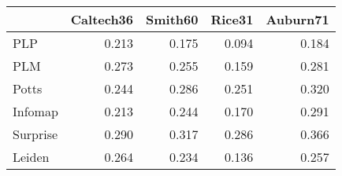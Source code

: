 \begin{tabular}{lrrrr}
\toprule
{} & Caltech36 & Smith60 & Rice31 & Auburn71 \\
\midrule
PLP      &     0.213 &   0.175 &  0.094 &    0.184 \\
PLM      &     0.273 &   0.255 &  0.159 &    0.281 \\
Potts    &     0.244 &   0.286 &  0.251 &    0.320 \\
Infomap  &     0.213 &   0.244 &  0.170 &    0.291 \\
Surprise &     0.290 &   0.317 &  0.286 &    0.366 \\
Leiden   &     0.264 &   0.234 &  0.136 &    0.257 \\
\bottomrule
\end{tabular}
